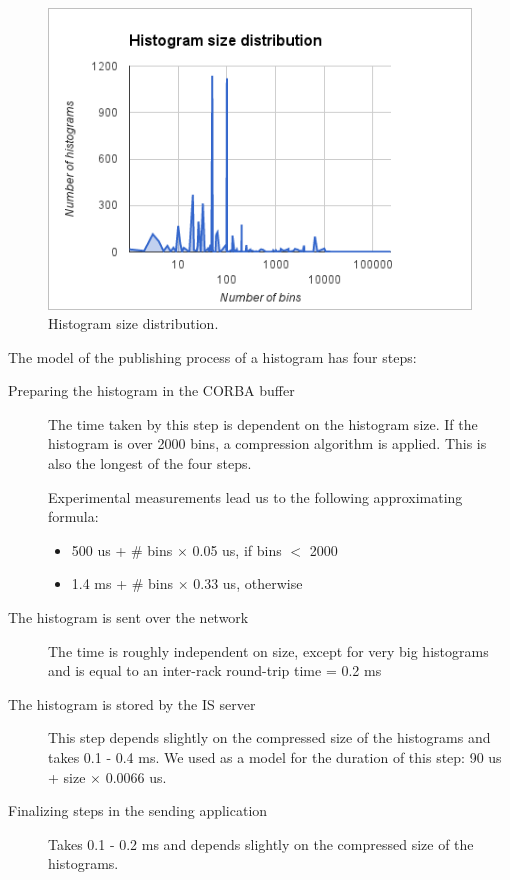 \begin{figure}[ht]
\centering
\includegraphics[scale=0.6]{Images/histo_distrib.png}
\caption{Histogram size distribution.}
\label{fig:histosize}
\end{figure}


The model of the publishing process of a histogram has four steps: 
\begin{description}
\item [Preparing the histogram in the CORBA buffer]
The time taken by this step is dependent on the histogram size. If the histogram is over 2000 bins, a compression algorithm is applied. This is also the longest of the four steps.

Experimental measurements lead us to the following approximating formula:
\begin{itemize}
\item 500 us + \# bins $\times$ 0.05 us, if bins $<$ 2000
\item 1.4 ms + \# bins $\times$ 0.33 us, otherwise 
\end{itemize}
\item[The histogram is sent over the network]
The time is roughly independent on size, except for very big histograms and is equal to an inter-rack round-trip time = 0.2 ms
\item[The histogram is stored by the IS server]
This step depends slightly on the compressed size of the histograms and takes 0.1 - 0.4 ms. We used as a model for the duration of this step: 90 us + size $\times$ 0.0066 us.
\item[Finalizing steps in the sending application]
Takes 0.1 - 0.2 ms and depends slightly on the compressed size of the histograms.
\end{description}

